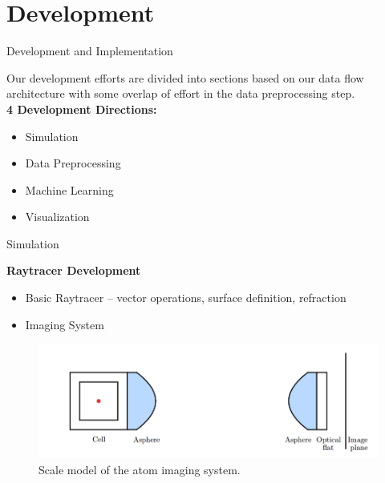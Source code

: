 \documentclass{beamer}
\begin{document}
\section{Development}

\begin{frame}{Development and Implementation}

Our development efforts are divided into sections based on our data flow architecture with some overlap of effort in the data preprocessing step.\\

\vspace{.3cm}
\textbf{4 Development Directions:}
\begin{itemize}
\item Simulation
\item Data Preprocessing
\item Machine Learning
\item Visualization
\end{itemize}

\end{frame}

\begin{frame}{Simulation}

\textbf{Raytracer Development}
\begin{itemize}
\item Basic Raytracer -- vector operations, surface definition, refraction
\item Imaging System
\end{itemize}

\begin{figure}
\includegraphics[scale=0.3]{asphere.png}
\caption{Scale model of the atom imaging system.}
\end{figure}

\end{frame}
\end{document}
